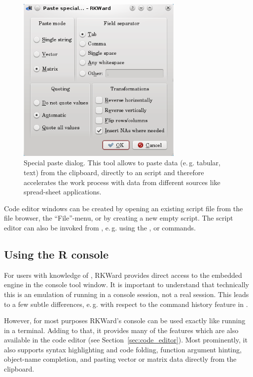 \begin{figure}[htp]
 \centering
 \includegraphics[width=8.042cm,height=8.143cm]{../figures/special_paste.png}
 \caption{Special paste dialog. This tool allows to paste data (e.\,g. tabular, text) from the clipboard, directly to an 
  script and therefore accelerates the work process with data from different sources 
 like spread-sheet applications.
}
 \label{fig:special_paste}
\end{figure}

Code editor windows can be created by opening an existing
 script file from the file browser, the
``File''-menu, or by creating a new empty script. The script editor can
also be invoked from , e.\,g. using the
,  or 
commands.

\subsection{Using the R console}
\label{sec:using_R_console}
For users with knowledge of , RKWard provides direct access to the
embedded  engine in the
 console tool window. It is important to understand that technically this is an
emulation of  running in a console
session, not a real  session. This leads to a few subtle
differences, e.\,g. with respect to the command history feature in
.

However, for most purposes RKWard's  console can be used exactly
like  running in a terminal. Adding to that, it provides many of the
features which are also available in the code editor (see Section~\ref{sec:code_editor}).
Most prominently, it also supports syntax highlighting and code
folding, function argument hinting, object-name completion, and pasting
vector or matrix data directly from the clipboard.


